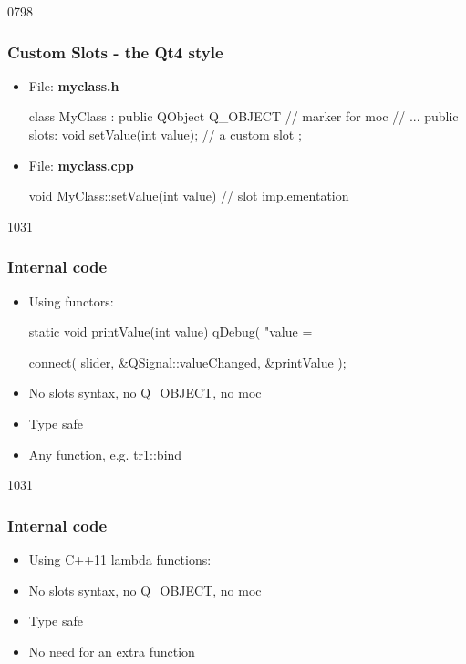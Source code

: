 \begin{slide}[fragile]{0798}\frametitle{Custom Slots - the Qt4 style}
 \label{codeForSlots1}
\begin{itemize}
\item File: \textbf{myclass.h} 
  \begin{cpp}
class MyClass : public QObject 
{
  Q_OBJECT // marker for moc
  // ...
public slots:
  void setValue(int value); // a custom slot
};
  \end{cpp}\medskip
\item File: \textbf{myclass.cpp}
  \begin{cpp}
void MyClass::setValue(int value) {
  // slot implementation
}
  \end{cpp}
\end{itemize}
\end{slide}

\begin{slide}[fragile]{1031}\frametitle{Internal code}
  \begin{itemize}
\item Using functors:\\
\begin{cpp}
static void printValue(int value) {
  qDebug( "value = %
}

connect( slider, &QSignal::valueChanged, &printValue );
\end{cpp}\medskip

\item[] \advantage No slots syntax, no Q\_OBJECT, no moc
\item[] \advantage Type safe
\item[] \advantage Any function, e.g. tr1::bind
\end{itemize}
\bigskip\bigskip
\end{slide}

\begin{slide}[fragile]{1031}\frametitle{Internal code}
  \begin{itemize}
\item Using C++11 lambda functions:\\
\medskip
\item[] \advantage No slots syntax, no Q\_OBJECT, no moc
\item[] \advantage Type safe
\item[] \advantage No need for an extra function
  \end{itemize}
\end{slide}

